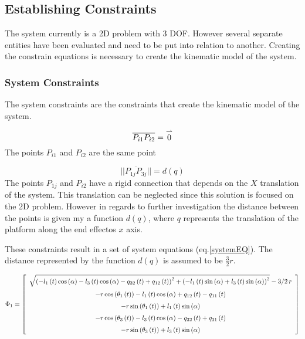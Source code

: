 \subsection{Establishing Constraints}

The system currently is a 2D problem with 3 DOF. However several separate entities have been evaluated and need to be put into relation to another. Creating the constrain equations is necessary to create the kinematic model of the system.

\subsubsection{System Constraints}

The system constraints are the constraints that create the kinematic model of the system.

\begin{equation}
   \overline{ P_{i1}P_{i2} } = \overset{\large\rightharpoonup}{\small{0}}
\end{equation}
The points $P_{i1}$ and $P_{i2}$ are the same point

\begin{equation}
   ||\overline{ P_{1j}P_{3j} } || = d(q)
\end{equation}
The points $P_{1j}$ and $P_{i2}$ have a rigid connection that depends on the $X$ translation of the system. This translation can be neglected since this solution is focused on the 2D problem. However in regards to further investigation the distance between the points is given my a function $d(q)$, where $q$ represents the translation of the platform along the end effectos $x$ axis.

These constraints result in a set of system equations (eq.\ref{systemEQ}). The distance represented by the function $d(q)$ is assumed to be $\frac{3}{2}r$.

\begin{equation*}
\Phi_{1} = \left[ \begin {array}{c} \sqrt { \left( -l_{1} \left( t \right) \cos
 \left( \alpha \right) -l_{3} \left( t \right) \cos \left( \alpha
 \right) -q_{32} \left( t \right) +q_{12} \left( t \right)  \right) ^{
2}+ \left( -l_{1} \left( t \right) \sin \left( \alpha \right) +l_{3}
 \left( t \right) \sin \left( \alpha \right)  \right) ^{2}}-3/2\,r
\\ \noalign{\medskip}-r\cos \left( \theta_{1} \left( t \right) 
 \right) -l_{1} \left( t \right) \cos \left( \alpha \right) +q_{12}
 \left( t \right) -q_{11} \left( t \right) \\ \noalign{\medskip}-r\sin
 \left( \theta_{1} \left( t \right)  \right) +l_{1} \left( t \right) 
\sin \left( \alpha \right) \\ \noalign{\medskip}-r\cos \left( \theta_{
3} \left( t \right)  \right) -l_{3} \left( t \right) \cos \left( 
\alpha \right) -q_{32} \left( t \right) +q_{31} \left( t \right) 
\\ \noalign{\medskip}-r\sin \left( \theta_{3} \left( t \right) 
 \right) +l_{3} \left( t \right) \sin \left( \alpha \right) 
\end {array} \right] 
\label{systemEQ}
\end{equation*}

